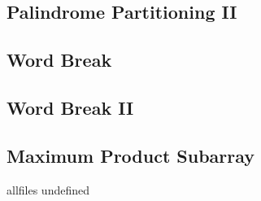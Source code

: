 \documentclass{article}
\begin{document}
\begin{CJK}{UTF8}{gbsn}
\subsection{Palindrome Partitioning II}

\subsection{Word Break}

\subsection{Word Break II}

\subsection{Maximum Product Subarray}


\ifx allfiles undefined
\end{CJK}
\end{document}
